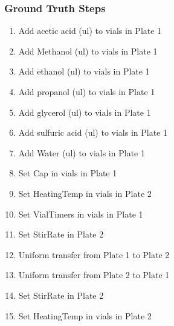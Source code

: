 \documentclass[sn-nature, twocolumn]{sn-jnl}%
\theoremstyle{thmstyleone}%
\theoremstyle{thmstyletwo}%
\theoremstyle{thmstylethree}%
\begin{document}
\subsubsection*{Ground Truth Steps}
\begin{enumerate}[itemsep=0pt]
    \item Add acetic acid (ul) to vials in Plate 1
    \item Add Methanol (ul) to vials in Plate 1
    \item Add ethanol (ul) to vials in Plate 1
    \item Add propanol (ul) to vials in Plate 1
    \item Add glycerol (ul) to vials in Plate 1
    \item Add sulfuric acid (ul) to vials in Plate 1
    \item Add Water (ul) to vials in Plate 1
    \item Set Cap in vials in Plate 1
    \item Set HeatingTemp in vials in Plate 2
    \item Set VialTimers in vials in Plate 1
    \item Set StirRate in Plate 2
    \item Uniform transfer from Plate 1 to Plate 2
    \item Uniform transfer from Plate 2 to Plate 1
    \item Set StirRate in Plate 2
    \item Set HeatingTemp in vials in Plate 2
\end{enumerate}
\end{document}
